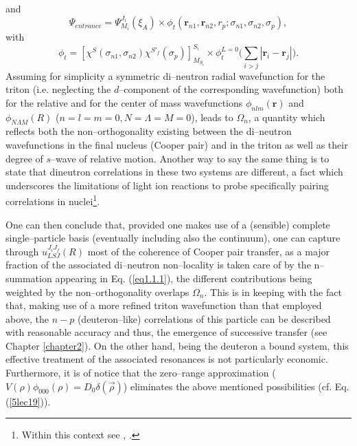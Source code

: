 and
\begin{equation}
\Psi_{entrance}=\Psi_{M_i}^{J_i}(\xi_A)\times\phi_t(\mathbf r_{n1},\mathbf r_{n2},r_p;\sigma_{n1},\sigma_{n2},\sigma_p),
\end{equation}
with
\begin{equation}\label{eq1.1.7}
\phi_t=\left[\chi^S(\sigma_{n1},\sigma_{n2})\chi^{S'_f}(\sigma_p)
\right]_{M_{S_i}}^{S_i}\times\phi_t^{L=0}\Big(\sum_{i>j}|\mathbf r_i-\mathbf r_j|\Big).
\end{equation}
Assuming for simplicity a symmetric di--neutron radial wavefunction for the triton  (i.e. neglecting the $d$--component of the corresponding wavefunction) both for the relative and for the center of mass wavefunctions $\phi_{nlm}(\mathbf{r})$ and $\phi_{N\Lambda M}(R)$ ($n=l=m=0, N=\Lambda=M=0$), leads to $\Omega_n$, a quantity which reflects both the non--orthogonality existing between the di--neutron wavefunctions in the final nucleus (Cooper pair) and in the triton as well as their degree of $s$--wave of relative motion. Another way to say the same thing is to state that dineutron correlations in these two systems are different, a fact which underscores the limitations of  light ion reactions to probe specifically pairing correlations in nuclei\footnote{Within this context see  \cite{vonOertzen:01}, \cite{Oertzen:13}.}.


One can then conclude that, provided one makes use of a (sensible) complete single--particle basis (eventually including also the continuum), one can capture through $u_{LSJ}^{J_iJ_f}(R)$ most of the coherence of Cooper pair transfer, as a major fraction of the associated di--neutron non--locality is taken care of by the n--summation appearing in Eq. (\ref{eq1.1.1}), the different contributions being weighted by the non--orthogonality overlaps $\Omega_n$. This is in keeping with the fact that, making use of a more refined triton wavefunction than that employed above, the $n-p$ (deuteron--like) correlations of this particle can be described with reasonable accuracy and thus, the emergence of successive transfer (see Chapter \ref{chapter2}). On the other hand, being the deuteron a bound system, this effective treatment of the associated resonances is not particularly economic. Furthermore, it is of notice that the zero--range approximation ($V(\rho)\phi_{000}(\rho)=D_0\delta(\vec \rho)$) eliminates the above mentioned possibilities (cf. Eq. (\ref{5lec19})).


